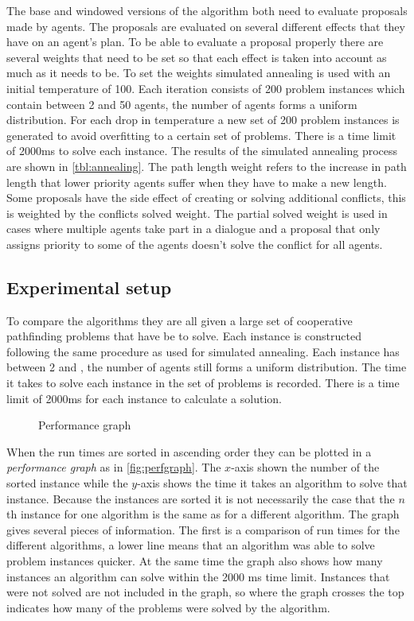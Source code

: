 The base and windowed versions of the algorithm both need to evaluate proposals
made by agents. The proposals are evaluated on several different effects that
they have on an agent's plan. To be able to evaluate a proposal properly there
are several weights that need to be set so that each effect is taken into
account as much as it needs to be. To set the weights simulated annealing
\cite{kirkpatrick1983} is used with an initial temperature of 100. Each
iteration consists of 200 problem instances which contain between 2 and 50
agents, the number of agents forms a uniform distribution. For each drop in
temperature a new set of 200 problem instances is generated to avoid
overfitting to a certain set of problems. There is a time limit of 2000ms to
solve each instance. The results of the simulated
annealing process are shown in \autoref{tbl:annealing}. The path length weight
refers to the increase in path length that lower priority agents suffer when
they have to make a new length. Some proposals have the side effect of creating
or solving additional conflicts, this is weighted by the conflicts solved
weight. The partial solved weight is used in cases where multiple agents take
part in a dialogue and a proposal that only assigns priority to some of the
agents doesn't solve the conflict for all agents.

\subsection{Experimental setup}
To compare the algorithms they are all given a large set of cooperative
pathfinding problems that have be to solve. Each instance is constructed
following the same procedure as used for simulated annealing. Each instance has
between 2 and \agentsupb, the number of agents still forms a uniform
distribution. The time it takes to solve each instance in the set of problems
is recorded. There is a time limit of 2000ms for each instance to calculate a
solution.

\begin{figure}
	\centering
	
	\caption{Performance graph}
	\label{fig:perfgraph}
\end{figure}

When the run times are sorted in ascending order they can be plotted
in a \emph{performance graph} as in \autoref{fig:perfgraph}. The $x$-axis shown
the number of the sorted instance while the $y$-axis shows the time it takes an
algorithm to solve that instance. Because the instances are sorted it is not
necessarily the case that the $n$th instance for one algorithm is the same as
for a different algorithm. The graph gives several pieces of information. The
first is a comparison of run times for the different algorithms, a lower line
means that an algorithm was able to solve problem instances quicker. At the
same time the graph also shows how many instances an algorithm can solve within
the 2000 ms time limit. Instances that were not solved are not included in the
graph, so where the graph crosses the top indicates how many of the problems
were solved by the algorithm.

